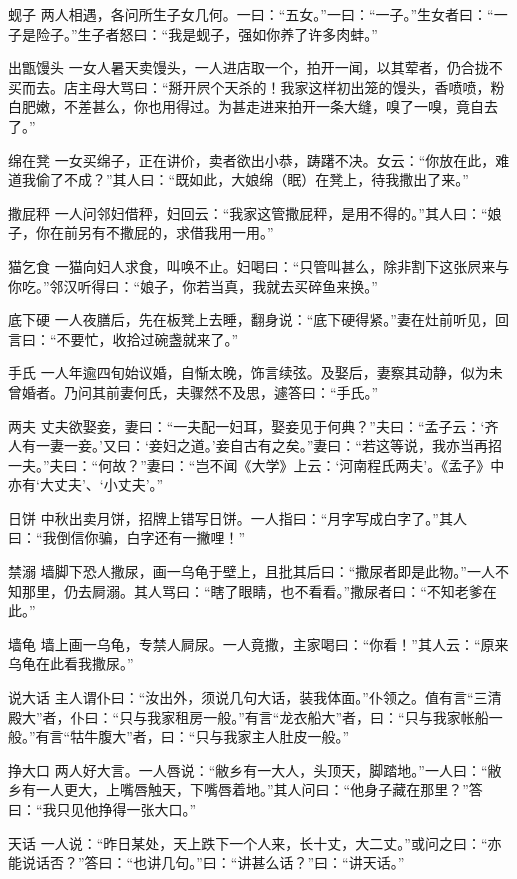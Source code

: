 \documentclass[12pt,UTF8]{ctexbook}
\begin{document}
蚬子
两人相遇，各问所生子女几何。一曰：“五女。”一曰：“一子。”生女者曰：“一子是险子。”生子者怒曰：“我是蚬子，强如你养了许多肉蚌。”

出甑馒头
一女人暑天卖馒头，一人进店取一个，拍开一闻，以其荤者，仍合拢不买而去。店主母大骂曰：“掰开屄个天杀的！我家这样初出笼的馒头，香喷喷，粉白肥嫩，不差甚么，你也用得过。为甚走进来拍开一条大缝，嗅了一嗅，竟自去了。”

绵在凳
一女买绵子，正在讲价，卖者欲出小恭，踌躇不决。女云：“你放在此，难道我偷了不成？”其人曰：“既如此，大娘绵（眠）在凳上，待我撒出了来。”

撒屁秤
一人问邻妇借秤，妇回云：“我家这管撒屁秤，是用不得的。”其人曰：“娘子，你在前另有不撒屁的，求借我用一用。”

猫乞食
一猫向妇人求食，叫唤不止。妇喝曰：“只管叫甚么，除非割下这张屄来与你吃。”邻汉听得曰：“娘子，你若当真，我就去买碎鱼来换。”

底下硬
一人夜膳后，先在板凳上去睡，翻身说：“底下硬得紧。”妻在灶前听见，回言曰：“不要忙，收拾过碗盏就来了。”

手氏
一人年逾四旬始议婚，自惭太晚，饰言续弦。及娶后，妻察其动静，似为未曾婚者。乃问其前妻何氏，夫骤然不及思，遽答曰：“手氏。”

两夫
丈夫欲娶妾，妻曰：“一夫配一妇耳，娶妾见于何典？”夫曰：“孟子云：‘齐人有一妻一妾。’又曰：‘妾妇之道。’妾自古有之矣。”妻曰：“若这等说，我亦当再招一夫。”夫曰：“何故？”妻曰：“岂不闻《大学》上云：‘河南程氏两夫’。《孟子》中亦有‘大丈夫’、‘小丈夫’。”

日饼
中秋出卖月饼，招牌上错写日饼。一人指曰：“月字写成白字了。”其人曰：“我倒信你骗，白字还有一撇哩！”

禁溺
墙脚下恐人撒尿，画一乌龟于壁上，且批其后曰：“撒尿者即是此物。”一人不知那里，仍去屙溺。其人骂曰：“瞎了眼睛，也不看看。”撒尿者曰：“不知老爹在此。”

墙龟
墙上画一乌龟，专禁人屙尿。一人竟撒，主家喝曰：“你看！”其人云：“原来乌龟在此看我撒尿。”

说大话
主人谓仆曰：“汝出外，须说几句大话，装我体面。”仆领之。值有言“三清殿大”者，仆曰：“只与我家租房一般。”有言“龙衣船大”者，曰：“只与我家帐船一般。”有言“牯牛腹大”者，曰：“只与我家主人肚皮一般。”

挣大口
两人好大言。一人唇说：“敝乡有一大人，头顶天，脚踏地。”一人曰：“敝乡有一人更大，上嘴唇触天，下嘴唇着地。”其人问曰：“他身子藏在那里？”答曰：“我只见他挣得一张大口。”

天话
一人说：“昨日某处，天上跌下一个人来，长十丈，大二丈。”或问之曰：“亦能说话否？”答曰：“也讲几句。”曰：“讲甚么话？”曰：“讲天话。”
\end{document}

